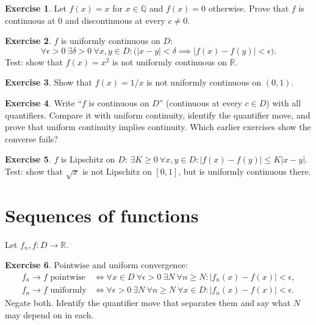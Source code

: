 \documentclass{workbook}
\theoremstyle{definition}
\newtheorem{exercise}{Exercise}[section]
\newcommand{\Q}{\mathbb{Q}}
\newcommand{\R}{\mathbb{R}}
\begin{document}
\begin{exercise}\label{ex:xq}
Let $f(x) = x$ for $x \in \Q$ and $f(x) = 0$ otherwise. Prove that $f$ is continuous at $0$ and discontinuous at every $c \ne 0$.
\end{exercise}

\begin{exercise}\label{ex:uc}
$f$ is uniformly continuous on $D$:
\[
  \forall \epsilon > 0\ \exists \delta > 0\ \forall x, y \in D : \bigl(|x - y| < \delta \implies |f(x) - f(y)| < \epsilon\bigr).
\]
Test: show that $f(x) = x^2$ is not uniformly continuous on $\R$.
\end{exercise}

\begin{exercise}\label{ex:ucrecip}
Show that $f(x) = 1/x$ is not uniformly continuous on $(0,1)$.
\end{exercise}

\begin{exercise}\label{ex:ucimpl}
Write ``$f$ is continuous on $D$'' (continuous at every $c \in D$) with all quantifiers. Compare it with uniform continuity, identify the quantifier move, and prove that uniform continuity implies continuity. Which earlier exercises show the converse fails?
\end{exercise}

\begin{exercise}\label{ex:lip}
$f$ is Lipschitz on $D$: $\exists K \ge 0\ \forall x, y \in D : |f(x) - f(y)| \le K |x - y|$. Test: show that $\sqrt{x}$ is not Lipschitz on $[0,1]$, but is uniformly continuous there.
\end{exercise}

\section{Sequences of functions}

Let $f_n, f \colon D \to \R$.

\begin{exercise}\label{ex:pw}
Pointwise and uniform convergence:
\begin{align*}
  f_n \to f \text{ pointwise} &\iff \forall x \in D\ \forall \epsilon > 0\ \exists N\ \forall n \ge N : |f_n(x) - f(x)| < \epsilon, \\
  f_n \to f \text{ uniformly} &\iff \forall \epsilon > 0\ \exists N\ \forall n \ge N\ \forall x \in D : |f_n(x) - f(x)| < \epsilon.
\end{align*}
Negate both. Identify the quantifier move that separates them and say what $N$ may depend on in each.
\end{exercise}
\end{document}
